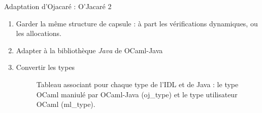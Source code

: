 \documentclass[xcolor={table,dvipsnames}]{beamer}
\begin{document}
\begin{frame}{Adaptation d'Ojacaré : O'Jacaré 2}

\begin{enumerate}
\item Garder la même structure de capsule : à part les vérifications dynamiques, ou les allocations.

\item Adapter à la bibliothèque \emph{Java} de OCaml-Java

\item Convertir les types

\begin{figure}
\caption{Tableau associant pour chaque type de l'IDL et de Java : le type OCaml maniulé par OCaml-Java (oj\_type) et le type utilisateur OCaml (ml\_type).}
\end{figure}

\end{enumerate}
\end{frame}
\end{document}
